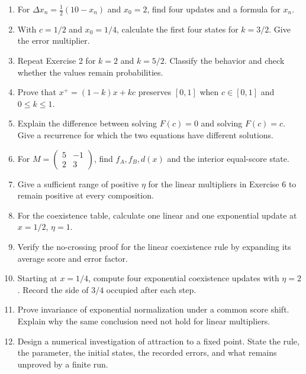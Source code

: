 \documentclass[11pt,oneside,openany]{book}
\theoremstyle{definition}
\theoremstyle{remark}
\newenvironment{exercises}{\begin{enumerate}[label=\thechapter.\arabic*,ref=\thechapter.\arabic*,leftmargin=2.8em,itemsep=6pt]}{\end{enumerate}}
\numberwithin{equation}{chapter}
\begin{document}
\begin{exercises}

\item 

For \(\Delta x_n=\tfrac12(10-x_n)\) and \(x_0=2\), find four updates and a formula for \(x_n\).

\item 

With \(c=1/2\) and \(x_0=1/4\), calculate the first four states for \(k=3/2\). Give the error multiplier.

\item 

Repeat Exercise 2 for \(k=2\) and \(k=5/2\). Classify the behavior and check whether the values remain probabilities.

\item 

Prove that \(x^+=(1-k)x+kc\) preserves \([0,1]\) when \(c\in[0,1]\) and \(0\leq k\leq1\).

\item 

Explain the difference between solving \(F(c)=0\) and solving \(F(c)=c\). Give a recurrence for which the two equations have different solutions.

\item 

For \(M=\left(\begin{smallmatrix}5&-1\\2&3\end{smallmatrix}\right)\), find \(f_A,f_B,d(x)\) and the interior equal-score state.

\item 

Give a sufficient range of positive \(\eta\) for the linear multipliers in Exercise 6 to remain positive at every composition.

\item 

For the coexistence table, calculate one linear and one exponential update at \(x=1/2\), \(\eta=1\).

\item 

Verify the no-crossing proof for the linear coexistence rule by expanding its average score and error factor.

\item 

Starting at \(x=1/4\), compute four exponential coexistence updates with \(\eta=2\). Record the side of \(3/4\) occupied after each step.

\item 

Prove invariance of exponential normalization under a common score shift. Explain why the same conclusion need not hold for linear multipliers.

\item 

Design a numerical investigation of attraction to a fixed point. State the rule, the parameter, the initial states, the recorded errors, and what remains unproved by a finite run.

\end{exercises}
\end{document}
